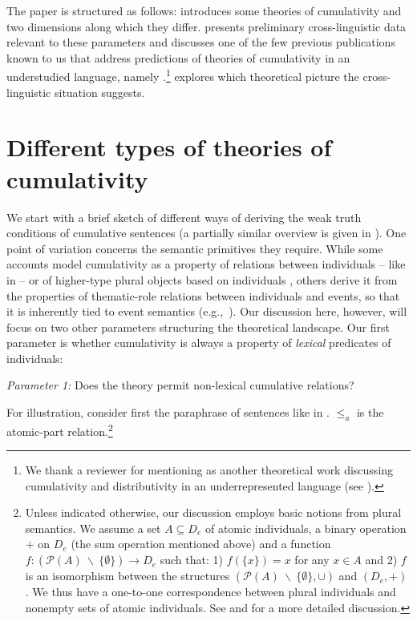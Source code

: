\documentclass[output=paper]{langscibook}
\begin{document}
The paper is structured as follows:  introduces some theories of cumulativity and two dimensions along which they differ.  presents preliminary cross-linguistic data relevant to these parameters and discusses one of the few previous publications known to us that address predictions of theories of cumulativity in an understudied language, namely \citet{Beck:2012}.\footnote{We thank a reviewer for mentioning \citet{Henderson:2012} as another theoretical work discussing cumulativity and distributivity in an underrepresented language (see ).}  explores which theoretical picture the cross-linguistic situation suggests.

\section{Different types of theories of cumulativity}\label{has-sch:sec:2}


We start with a brief sketch of different ways of deriving the weak truth conditions of cumulative sentences (a partially similar overview is given in \citealt{Champollion:2015b}). One point of variation concerns the semantic primitives they require. While some accounts \citep{Scha:1981,Krifka:1986,Beck:2000a,Champollion:2010a} model cumulativity as a property of relations between individuals -- like  in  -- or of higher-type plural objects based on individuals \citep{Schmitt:2019}, others derive it from the properties of thematic-role relations between individuals and events, so that it is inherently tied to event semantics (e.g.,~\citealt{Schein:1993, Landman:2000, Kratzer:2003, Ferreira:2005, Zweig:2008, Zweig:2009}). Our discussion here, however, will focus on two other parameters structuring the theoretical landscape. Our first parameter is whether cumulativity is always a property of \textit{lexical}  predicates of individuals:

\ea\label{has-sch:par1} \textit{Parameter 1:} Does the theory permit non-lexical cumulative relations?\z

\noindent For illustration, consider first the paraphrase of sentences like  in . 
 $\leq_a$ is the atomic-part relation.\footnote{Unless indicated otherwise, our discussion employs basic notions from plural semantics.  We assume a set $A \subseteq D_e$ of atomic individuals, a binary operation $+$ on $D_e$  (the sum operation mentioned above) and a function $f: (\mathcal{P}(A)\ \backslash\ \{\emptyset\}) \to D_e$ such that: 1) $f(\{x\}) = x$ for any $x \in A$ and 2) $f$ is an isomorphism between the structures $(\mathcal{P}(A)\ \backslash\ \{\emptyset\}, \cup)$ and $(D_e, +)$. We thus have a one-to-one correspondence between plural individuals and nonempty sets of atomic individuals. See \citet{Link:1983} and \citet{Champollion:2016Mereology} for a more detailed discussion.} 
 
\end{document}

